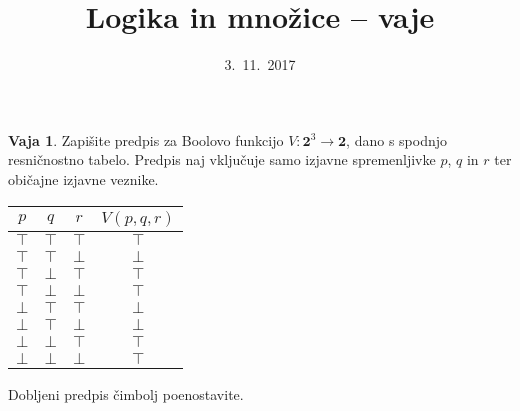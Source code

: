 \documentclass{article}
\newcommand{\lthen}{\Rightarrow}
\newcommand{\two}{\mathbf{2}}
\newcommand{\true}{\top}
\newcommand{\false}{\bot}
\theoremstyle{definition}
\newtheorem{vaja}{Vaja}
\begin{document}
\title{Logika in množice -- vaje}
\date{3.~11.~2017}
\maketitle

\begin{vaja}
  Zapišite predpis za Boolovo funkcijo $V\colon \two^3 \to \two$, dano s spodnjo
  res\-ni\-čno\-stno tabelo. Predpis naj vključuje samo izjavne spremenljivke $p$, $q$ in
  $r$ ter običajne izjavne veznike.
  \smallskip
  \begin{center}
    \begin{tabular}{ccc|c}
      $p$ & $q$ & $r$ & $V(p, q, r)$ \\
      \hline
      $\true$ & $\true$ & $\true$ & $\true$  \\
      $\true$ & $\true$ & $\false$ & $\false$  \\
      $\true$ & $\false$ & $\true$ & $\true$  \\
      $\true$ & $\false$ & $\false$ & $\true$  \\
      $\false$ & $\true$ & $\true$ & $\false$  \\
      $\false$ & $\true$ & $\false$ & $\false$  \\
      $\false$ & $\false$ & $\true$ & $\true$  \\
      $\false$ & $\false$ & $\false$ & $\true$  \\
    \end{tabular}
  \end{center}
  \smallskip
  Dobljeni predpis čimbolj poenostavite.
\end{vaja}
\end{document}
